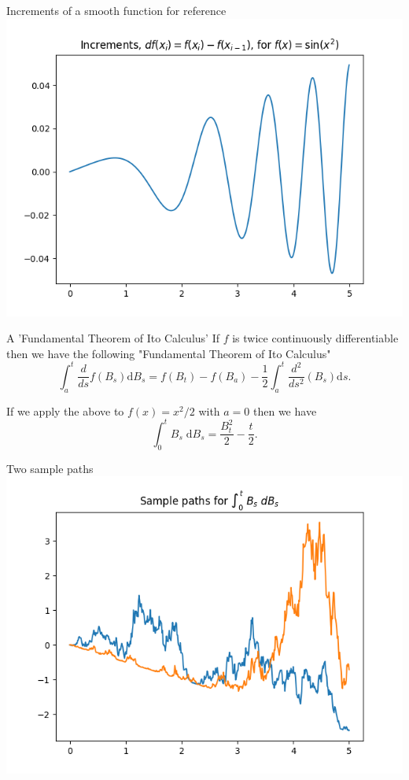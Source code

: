 \documentclass{beamer}%
\numberwithin{equation}{section}
\newcommand{\ud}{\ensuremath{\mathrm{d} }}
\begin{document}
	\begin{frame}{Increments of a smooth function for reference}
		\centering
		\includegraphics[scale=.7]{niceincrements.png}
	\end{frame}
	
	
	
	\begin{frame}[t]{A 'Fundamental Theorem of Ito Calculus'}
		If $f$ is twice continuously differentiable then we have the following "Fundamental Theorem of Ito Calculus"
		\[
		\int_a^t \frac{d}{ds} f(B_s) \ud B_s = f(B_t) - f(B_a) - \frac{1}{2} \int_a^t \frac{d^2}{ds^2}(B_s) \ud s.
		\]
		
		\begin{example}
			If we apply the above to $f(x) = x^2 / 2$ with $a=0$ then we have 
			\[
			\int_0^t B_s \; \ud B_s = \frac{B_t^2}{2}  - \frac{t}{2}.
			\]
			
		\end{example}
		
	\end{frame}
	
	\begin{frame}{Two sample paths}
		\includegraphics[scale=.7]{StochIntegralExample}
	\end{frame}
	
\end{document}
